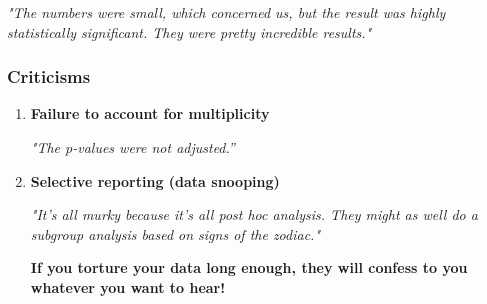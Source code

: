 \documentclass[xcolor={dvipsnames}]{beamer}
\begin{document}
\begin{frame}
\vspace{.1cm}

\emph{"The numbers were small, which concerned us, but the result was highly statistically significant. They were pretty incredible results."}

\end{frame}

\begin{frame}
\frametitle{Criticisms}

\begin{enumerate}
\item \textcolor{cambridgedarkorange}{\textbf{Failure to account for multiplicity}}

\bigskip 

\emph{"The p-values were not adjusted.''}
% 
% 
% 


\bigskip 

\item \textcolor{cambridgedarkorange}{\textbf{Selective reporting (data snooping)}}

\bigskip 

\emph{"It's all murky because it's all post hoc analysis. They might as well do a subgroup analysis based on signs of the zodiac."}

\bigskip

\textbf{If you torture your data long enough, they will confess to you whatever you want to hear!}
\end{enumerate}

\end{frame}
\end{document}
